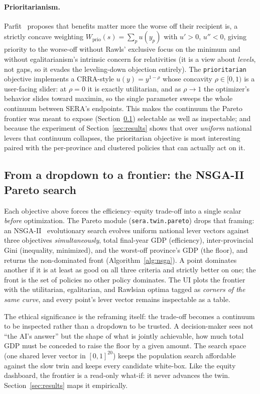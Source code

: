 \documentclass[11pt,a4paper]{article}
\newcommand{\code}[1]{\texttt{#1}}
\begin{document}
\paragraph{Prioritarianism.} Parfit~\cite{parfit1997} proposes that benefits
matter more the worse off their recipient is, a strictly concave weighting
$W_{\text{prio}}(s) = \sum_p u(y_p)$ with $u' > 0$, $u'' < 0$, giving
priority to the worse-off without Rawls' exclusive focus on the minimum and
without egalitarianism's intrinsic concern for relativities (it is a view
about \emph{levels}, not gaps, so it evades the leveling-down objection
entirely). The \code{prioritarian} objective implements a CRRA-style
$u(y) = y^{1-\rho}$ whose concavity $\rho \in [0, 1)$ is a user-facing slider:
at $\rho = 0$ it is exactly utilitarian, and as $\rho \to 1$ the optimizer's
behavior slides toward maximin, so the single parameter sweeps the whole
continuum between SERA's endpoints. This makes the continuum the Pareto frontier
was meant to expose (Section~\ref{sec:pareto}) selectable as well as
inspectable; and because the experiment of Section~\ref{sec:results} shows that
over \emph{uniform} national levers that continuum collapses, the prioritarian
objective is most interesting paired with the per-province and clustered
policies that can actually act on it.

\subsection{From a dropdown to a frontier: the NSGA-II Pareto search}
\label{sec:pareto}

Each objective above forces the efficiency--equity trade-off into a single
scalar \emph{before} optimization. The Pareto module
(\code{sera.twin.pareto}) drops that framing: an NSGA-II~\cite{deb2002}
evolutionary search evolves uniform national lever vectors against three
objectives \emph{simultaneously}, total final-year GDP (efficiency),
inter-provincial Gini (inequality, minimized), and the worst-off province's GDP
(the floor), and returns the non-dominated front
(Algorithm~\ref{alg:nsga}). A point dominates another if it is at least as
good on all three criteria and strictly better on one; the front is the set of
policies no other policy dominates. The UI plots the frontier with the
utilitarian, egalitarian, and Rawlsian optima tagged as \emph{corners of the
same curve}, and every point's lever vector remains inspectable as a table.

The ethical significance is the reframing itself: the trade-off becomes a
continuum to be inspected rather than a dropdown to be trusted. A
decision-maker sees not ``the AI's answer'' but the shape of what is jointly
achievable, how much total GDP must be conceded to raise the floor by a
given amount. The search space (one shared lever vector in $[0,1]^{20}$) keeps
the population search affordable against the slow twin and keeps every
candidate white-box. Like the equity dashboard, the frontier is a read-only
what-if: it never advances the twin. Section~\ref{sec:results} maps it
empirically.
\end{document}
